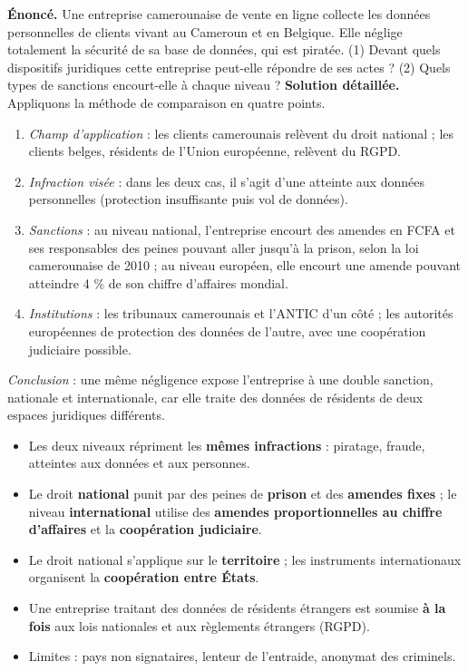 \documentclass[11pt]{article}
\begin{document}
\begin{exoresolu}
\textbf{Énoncé.} Une entreprise camerounaise de vente en ligne collecte les données personnelles de clients vivant au Cameroun et en Belgique. Elle néglige totalement la sécurité de sa base de données, qui est piratée. (1) Devant quels dispositifs juridiques cette entreprise peut-elle répondre de ses actes ? (2) Quels types de sanctions encourt-elle à chaque niveau ?
\tcblower
\textbf{Solution détaillée.} Appliquons la méthode de comparaison en quatre points.
\begin{enumerate}
\item \emph{Champ d'application} : les clients camerounais relèvent du droit national ; les clients belges, résidents de l'Union européenne, relèvent du RGPD.
\item \emph{Infraction visée} : dans les deux cas, il s'agit d'une atteinte aux données personnelles (protection insuffisante puis vol de données).
\item \emph{Sanctions} : au niveau national, l'entreprise encourt des amendes en FCFA et ses responsables des peines pouvant aller jusqu'à la prison, selon la loi camerounaise de 2010 ; au niveau européen, elle encourt une amende pouvant atteindre 4 \% de son chiffre d'affaires mondial.
\item \emph{Institutions} : les tribunaux camerounais et l'ANTIC d'un côté ; les autorités européennes de protection des données de l'autre, avec une coopération judiciaire possible.
\end{enumerate}
\emph{Conclusion} : une même négligence expose l'entreprise à une double sanction, nationale et internationale, car elle traite des données de résidents de deux espaces juridiques différents.
\end{exoresolu}

\begin{aretenir}
\begin{itemize}
\item Les deux niveaux répriment les \textbf{mêmes infractions} : piratage, fraude, atteintes aux données et aux personnes.
\item Le droit \textbf{national} punit par des peines de \textbf{prison} et des \textbf{amendes fixes} ; le niveau \textbf{international} utilise des \textbf{amendes proportionnelles au chiffre d'affaires} et la \textbf{coopération judiciaire}.
\item Le droit national s'applique sur le \textbf{territoire} ; les instruments internationaux organisent la \textbf{coopération entre États}.
\item Une entreprise traitant des données de résidents étrangers est soumise \textbf{à la fois} aux lois nationales et aux règlements étrangers (RGPD).
\item Limites : pays non signataires, lenteur de l'entraide, anonymat des criminels.
\end{itemize}
\end{aretenir}
\end{document}
